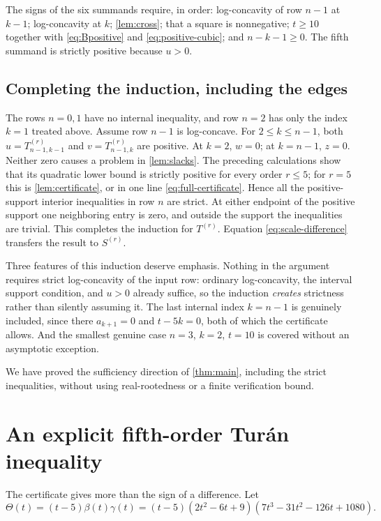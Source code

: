 \documentclass[11pt,a4paper]{article}
\numberwithin{equation}{section}
\theoremstyle{definition}
\theoremstyle{remark}
\newcommand{\Turan}{Tur\'an}
\begin{document}
The signs of the six summands require, in order: log-concavity of row
$n-1$ at $k-1$; log-concavity at $k$; \cref{lem:cross}; that a square is
nonnegative; $t\ge10$ together with \eqref{eq:Bpositive} and
\eqref{eq:positive-cubic}; and $n-k-1\ge0$. The fifth summand is strictly
positive because $u>0$.

\subsection{Completing the induction, including the edges}

The rows $n=0,1$ have no internal inequality, and row $n=2$ has only the
index $k=1$ treated above. Assume row $n-1$ is log-concave.
For $2\le k\le n-1$, both $u=T^{(r)}_{n-1,k-1}$ and
$v=T^{(r)}_{n-1,k}$ are positive. At $k=2$, $w=0$; at $k=n-1$, $z=0$.
Neither zero causes a problem in \cref{lem:slacks}. The preceding
calculations show that its quadratic lower bound is strictly positive for
every order $r\le5$; for $r=5$ this is \cref{lem:certificate}, or in one
line \eqref{eq:full-certificate}. Hence all the positive-support interior
inequalities in row $n$ are strict. At either endpoint of the positive
support one neighboring entry is zero, and outside the support the
inequalities are trivial. This completes the induction for $T^{(r)}$.
Equation \eqref{eq:scale-difference} transfers the result to $S^{(r)}$.

Three features of this induction deserve emphasis. Nothing in the argument
requires strict log-concavity of the input row: ordinary log-concavity, the
interval support condition, and $u>0$ already suffice, so the induction
\emph{creates} strictness rather than silently assuming it. The last
internal index $k=n-1$ is genuinely included, since there $a_{k+1}=0$ and
$t-5k=0$, both of which the certificate allows. And the smallest genuine
case $n=3$, $k=2$, $t=10$ is covered without an asymptotic exception.

We have proved the sufficiency direction of \cref{thm:main}, including the
strict inequalities, without using real-rootedness or a finite
verification bound.

\section{An explicit fifth-order \Turan{} inequality}\label{sec:quantitative}

The certificate gives more than the sign of a difference. Let
\begin{equation}\label{eq:Theta}
 \Theta(t)=(t-5)\beta(t)\gamma(t)
   =(t-5)(2t^2-6t+9)(7t^3-31t^2-126t+1080).
\end{equation}
\end{document}
